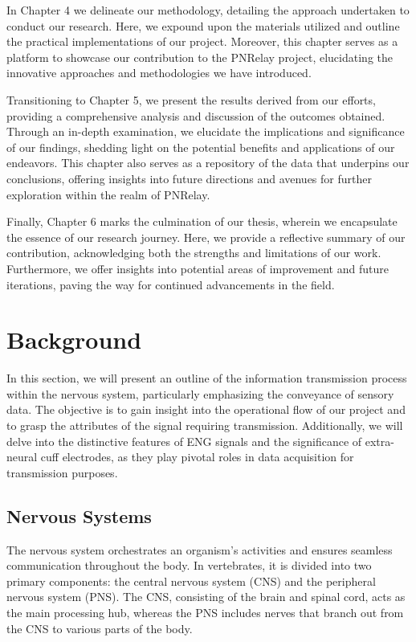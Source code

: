 \documentclass{Configuration_Files/PoliMi3i_thesis}
\begin{document}
In Chapter 4 we delineate our methodology, detailing the approach undertaken to conduct our research. Here, we expound upon the materials utilized and outline the practical implementations of our project. Moreover, this chapter serves as a platform to showcase our contribution to the PNRelay project, elucidating the innovative approaches and methodologies we have introduced.

Transitioning to Chapter 5, we present the results derived from our efforts, providing a comprehensive analysis and discussion of the outcomes obtained. Through an in-depth examination, we elucidate the implications and significance of our findings, shedding light on the potential benefits and applications of our endeavors. This chapter also serves as a repository of the data that underpins our conclusions, offering insights into future directions and avenues for further exploration within the realm of PNRelay.

Finally, Chapter 6 marks the culmination of our thesis, wherein we encapsulate the essence of our research journey. Here, we provide a reflective summary of our contribution, acknowledging both the strengths and limitations of our work. Furthermore, we offer insights into potential areas of improvement and future iterations, paving the way for continued advancements in the field.





\chapter{Background}

In this section, we will present an outline of the information transmission process within the nervous system, particularly emphasizing the conveyance of sensory data. The objective is to gain insight into the operational flow of our project and to grasp the attributes of the signal requiring transmission. Additionally, we will delve into the distinctive features of ENG signals and the significance of extra-neural cuff electrodes, as they play pivotal roles in data acquisition for transmission purposes.

\section{Nervous Systems}

The nervous system orchestrates an organism's activities and ensures seamless communication throughout the body. In vertebrates, it is divided into two primary components: the central nervous system (CNS) and the peripheral nervous system (PNS). The CNS, consisting of the brain and spinal cord, acts as the main processing hub, whereas the PNS includes nerves that branch out from the CNS to various parts of the body.
\end{document}

